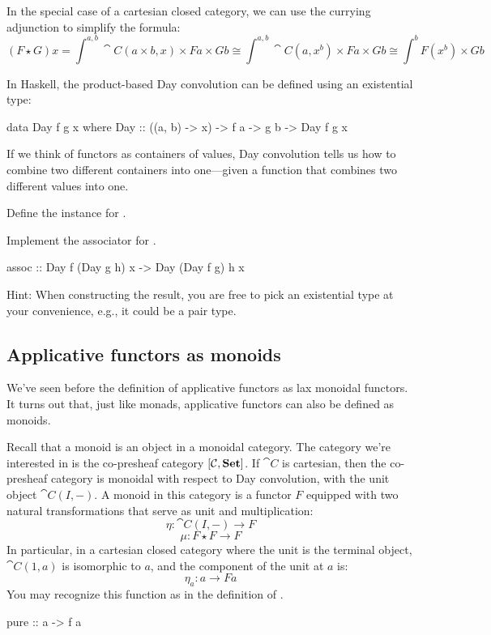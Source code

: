 \documentclass[DaoFP]{subfiles}
\begin{document}
In the special case of a cartesian closed category, we can use the currying adjunction to simplify the formula:
\[ (F \star G) x = \int^{a, b} \cat C (a \times b, x) \times F a \times G b \cong  \int^{a, b} \cat C (a, x^b) \times F a \times G b \cong  \int^{b}  F (x^b) \times G b\]

In Haskell, the product-based Day convolution can be defined using an existential type:
\begin{haskell}
data Day f g x where
  Day :: ((a, b) -> x) -> f a -> g b -> Day f g x
\end{haskell}

If we think of functors as containers of values, Day convolution tells us how to combine two different containers into one---given a function that combines two different values into one. 

\begin{exercise}
Define the  instance for .
\end{exercise}

\begin{exercise}
Implement the associator for .
\begin{haskell}
assoc :: Day f (Day g h) x -> Day (Day f g) h x
\end{haskell}
Hint: When constructing the result, you are free to pick an existential type at your convenience, e.g., it could be a pair type.
\end{exercise}


\subsection{Applicative functors as monoids}
 
 We've seen before the definition of applicative functors as lax monoidal functors. It turns out that, just like monads, applicative functors can also be defined as monoids. 
 
Recall that a monoid is an object in a monoidal category. The category we're interested in is the co-presheaf category $[\mathcal{C}, \mathbf{Set}]$. If $\cat C$ is cartesian, then the co-presheaf category is monoidal with respect to Day convolution, with the unit object $\cat C(I, -)$. A monoid in this category is a functor $F$ equipped with two natural transformations that serve as unit and multiplication:
\[ \eta \colon \cat C(I, -) \to F \]
\[ \mu \colon F \star F \to F \]
In particular, in a cartesian closed category where the unit is the terminal object, $\cat C(1, a)$ is isomorphic to $a$, and the component of the unit at $a$ is:
\[ \eta_a \colon a \to F a \] 
You may recognize this function as  in the definition of .
\begin{haskell}
pure :: a -> f a
\end{haskell}
\end{document}
